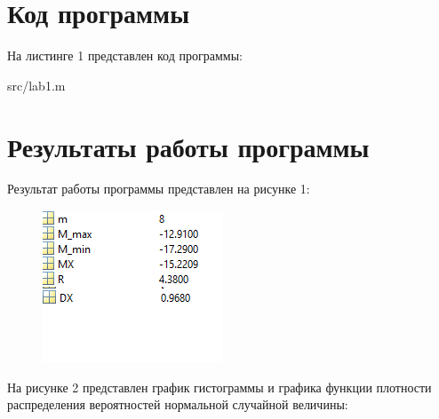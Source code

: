 
\newpage
\section*{Код программы}
На листинге 1 представлен код программы:
\FloatBarrier
\begin{lstinputlisting}{src/lab1.m}
\end{lstinputlisting}
\FloatBarrier

\section*{Результаты работы программы}
Результат работы программы представлен на рисунке 1:
\FloatBarrier
\begin{figure}[h]
	\begin{center}
		\includegraphics[width=\linewidth]{inc/result.png}
	\end{center}
\end{figure}
\FloatBarrier
На рисунке 2 представлен график гистограммы и графика функции плотности распределения вероятностей нормальной случайной величины:
\FloatBarrier

